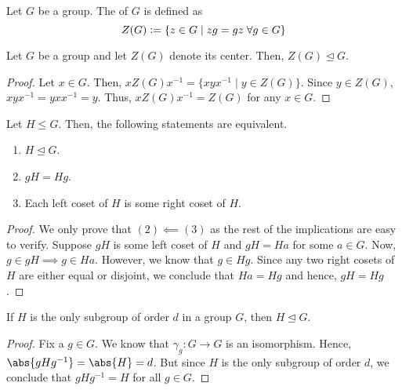 \begin{defn}[Center]
    Let $G$ be a group. The  of $G$ is defined as
    \[
        Z(G) \vcentcolon= \{ z \in G  \mid zg = gz \; \forall g \in G \}
    \]
\end{defn}
\begin{prop} \label{prop:center-is-normal}
    Let $G$ be a group and let $Z(G)$ denote its center. Then, $Z(G) \trianglelefteq G$.
\end{prop}
\begin{proof}
    Let $x \in G$. Then, $xZ(G)x^{-1} = \{ xyx^{-1} \mid y \in Z(G) \}$. Since $y \in Z(G)$, $xyx^{-1} = yxx^{-1} = y$. Thus, $xZ(G)x^{-1} = Z(G)$ for any $x \in G$.
\end{proof}
\begin{prop} \label{prop:normal-basics}
    Let $H \leq G$. Then, the following statements are equivalent.
    \begin{enumerate}
        \item $H \trianglelefteq G$.
        \item $gH = Hg$.
        \item Each left coset of $H$ is some right coset of $H$.
    \end{enumerate}
\end{prop}
\begin{proof}
    We only prove that $(2) \impliedby (3)$ as the rest of the implications are easy to verify. Suppose $gH$ is some left coset of $H$ and $gH = Ha$ for some $a \in G$. Now, $g \in gH \implies g \in Ha$. However, we know that $g \in Hg$. Since any two right cosets of $H$ are either equal or disjoint, we conclude that $Ha = Hg$ and hence, $gH = Hg$.
\end{proof}
\begin{cor} \label{cor:only-subgroup-order-normal}
    If $H$ is the only subgroup of order $d$ in a group $G$, then $H \trianglelefteq G$.
\end{cor}
\begin{proof}
    Fix a $g \in G$. We know that $\gamma_g \colon G \to G$ is an isomorphism. Hence, $\abs{gHg^{-1}} = \abs{H} = d$. But since $H$ is the only subgroup of order $d$, we conclude that $gHg^{-1} = H$ for all $g \in G$.
\end{proof}

